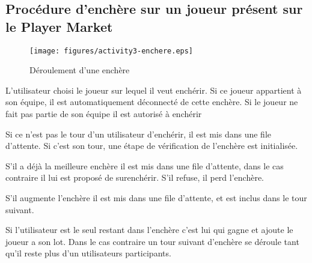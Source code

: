 \subsection{Procédure d'enchère sur un joueur présent sur le Player Market}
\label{fig:Enchere}
\begin{figure}[h!]
  \centering
  \texttt{[image: figures/activity3-enchere.eps]}
  \caption{\label{fig:Enchere} Déroulement d'une enchère}
\end{figure}
\begin{list}{}{\leftmargin=1.5em}
\item{L'utilisateur choisi le joueur sur lequel il veut enchérir. Si ce joueur appartient à son équipe, il est automatiquement déconnecté de cette enchère. Si le joueur ne fait pas partie de son équipe il est autorisé à enchérir}
\item{Si ce n'est pas  le tour d'un utilisateur d'enchérir, il est mis dans une file d'attente. Si c'est son tour, une étape de vérification de l'enchère est initialisée.}
\item{S'il a déjà la meilleure enchère il est mis dans une file d'attente, dans le cas contraire il lui est proposé de surenchérir. S'il refuse, il perd l'enchère.}
\item{S'il augmente l'enchère il est mis dans une file d'attente, et est inclus dans le tour suivant.}
\item{Si l'utilisateur est le seul restant dans l'enchère c'est lui qui gagne et ajoute le joueur a son lot. Dans le cas contraire un tour suivant d'enchère se déroule tant qu'il reste plus d'un utilisateurs participants.}
\end{list}
%
%
%
